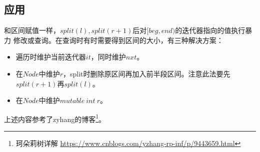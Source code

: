 \subsection{应用}
和区间赋值一样，$split(l),split(r+1)$后对$[beg,end)$的迭代器指向的值执行暴力
修改或查询。在查询时有时需要得到区间的大小，有三种解决方案：
\begin{itemize}
    \item 遍历时维护当前迭代器$it$，同时维护$nxt$。
    \item 在$Node$中维护$r$，split时删除原区间再加入前半段区间。注意此法要先
    $split(r+1)$再$split(l)$。
    \item 在$Node$中维护$mutable~int~r$。
\end{itemize}

上述内容参考了zyhang的博客\footnote{
    珂朵莉树详解
    \url{https://www.cnblogs.com/yzhang-rp-inf/p/9443659.html}
}。
